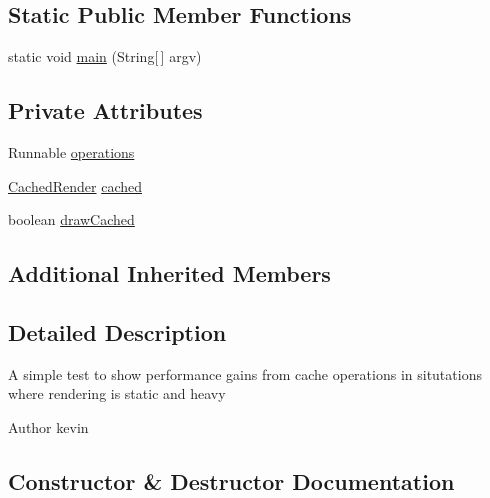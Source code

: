 \subsection*{Static Public Member Functions}
\begin{DoxyCompactItemize}
\item 
static void \mbox{\hyperlink{classorg_1_1newdawn_1_1slick_1_1tests_1_1_cached_render_test_a49297378321ea39d8ec3850beaf1266f}{main}} (String\mbox{[}$\,$\mbox{]} argv)
\end{DoxyCompactItemize}
\subsection*{Private Attributes}
\begin{DoxyCompactItemize}
\item 
Runnable \mbox{\hyperlink{classorg_1_1newdawn_1_1slick_1_1tests_1_1_cached_render_test_a2b36bcbc4ab1194e7809b06b2457ca84}{operations}}
\item 
\mbox{\hyperlink{classorg_1_1newdawn_1_1slick_1_1_cached_render}{Cached\+Render}} \mbox{\hyperlink{classorg_1_1newdawn_1_1slick_1_1tests_1_1_cached_render_test_a62630e9785f2d264aece45743623722a}{cached}}
\item 
boolean \mbox{\hyperlink{classorg_1_1newdawn_1_1slick_1_1tests_1_1_cached_render_test_ab144e14912cdadf27a4bfcdb5379d49c}{draw\+Cached}}
\end{DoxyCompactItemize}
\subsection*{Additional Inherited Members}


\subsection{Detailed Description}
A simple test to show performance gains from cache operations in situtations where rendering is static and heavy

\begin{DoxyAuthor}{Author}
kevin 
\end{DoxyAuthor}


\subsection{Constructor \& Destructor Documentation}
\mbox{\label{classorg_1_1newdawn_1_1slick_1_1tests_1_1_cached_render_test_aec210751ba11df5b8061d362723f21f0}} 
